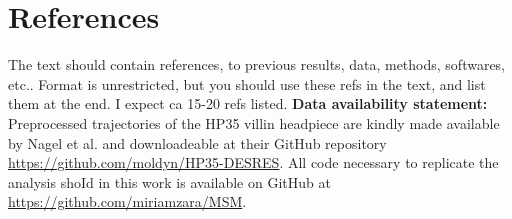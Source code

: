 \documentclass[prl,twocolumn]{revtex4-1}
\begin{document}
\section{References}
{ \color{blue}
The text should contain references, to previous results, data, methods, softwares, etc.. Format is unrestricted, but you should use these refs in the text, and list them at the end. I expect ca 15-20 refs listed.
}
\newline \noindent \textbf{Data availability statement:} Preprocessed trajectories of the HP35 villin headpiece are kindly made available by Nagel et al. and downloadeable at their GitHub repository \url{https://github.com/moldyn/HP35-DESRES}.
All code necessary to replicate the analysis shoId in this work is available on GitHub at \url{https://github.com/miriamzara/MSM}.
\end{document}
